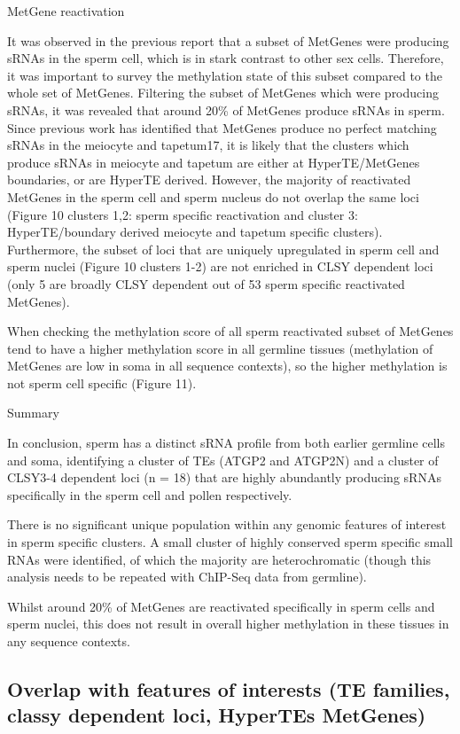 MetGene reactivation

It was observed in the previous report that a subset of MetGenes were producing sRNAs in the sperm cell, which is in stark contrast to other sex cells. Therefore, it was important to survey the methylation state of this subset compared to the whole set of MetGenes. Filtering the subset of MetGenes which were producing sRNAs, it was revealed that around 20\% of MetGenes produce sRNAs in sperm. Since previous work has identified that MetGenes produce no perfect matching sRNAs in the meiocyte and tapetum17, it is likely that the clusters which produce sRNAs in meiocyte and tapetum are either at HyperTE/MetGenes boundaries, or are HyperTE derived. However, the majority of reactivated MetGenes in the sperm cell and sperm nucleus do not overlap the same loci (Figure 10 clusters 1,2: sperm specific reactivation and cluster 3: HyperTE/boundary derived meiocyte and tapetum specific clusters). Furthermore, the subset of loci that are uniquely upregulated in sperm cell and sperm nuclei (Figure 10 clusters 1-2) are not enriched in CLSY dependent loci (only 5 are broadly CLSY dependent out of 53 sperm specific reactivated MetGenes).

When checking the methylation score of all sperm reactivated subset of MetGenes tend to have a higher methylation score in all germline tissues (methylation of MetGenes are low in soma in all sequence contexts), so the higher methylation is not sperm cell specific (Figure 11).




Summary

In conclusion, sperm has a distinct sRNA profile from both earlier germline cells and soma, identifying a cluster of TEs (ATGP2 and ATGP2N) and a cluster of CLSY3-4 dependent loci (n = 18) that are highly abundantly producing sRNAs specifically in the sperm cell and pollen respectively.

There is no significant unique population within any genomic features of interest in sperm specific clusters. A small cluster of highly conserved sperm specific small RNAs were identified, of which the majority are heterochromatic (though this analysis needs to be repeated with ChIP-Seq data from germline).

Whilst around 20\% of MetGenes are reactivated specifically in sperm cells and sperm nuclei, this does not result in overall higher methylation in these tissues in any sequence contexts.


\subsection{Overlap with features of interests (TE families, classy dependent loci, HyperTEs MetGenes)}

